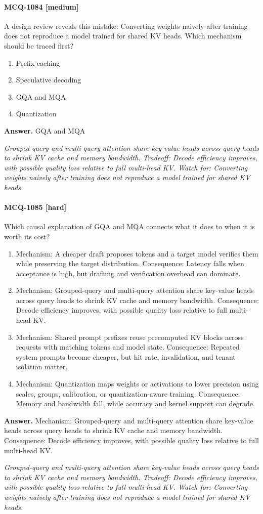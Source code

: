 \paragraph{MCQ-1084 [medium]} A design review reveals this mistake: Converting weights naively after training does not reproduce a model trained for shared KV heads. Which mechanism should be traced first?
\begin{enumerate}[label=\Alph*.]
\item Prefix caching
\item Speculative decoding
\item GQA and MQA
\item Quantization
\end{enumerate}
\noindent\textbf{Answer.} GQA and MQA
\par\textit{Grouped-query and multi-query attention share key-value heads across query heads to shrink KV cache and memory bandwidth. Tradeoff: Decode efficiency improves, with possible quality loss relative to full multi-head KV. Watch for: Converting weights naively after training does not reproduce a model trained for shared KV heads.}
\paragraph{MCQ-1085 [hard]} Which causal explanation of GQA and MQA connects what it does to when it is worth its cost?
\begin{enumerate}[label=\Alph*.]
\item Mechanism: A cheaper draft proposes tokens and a target model verifies them while preserving the target distribution. Consequence: Latency falls when acceptance is high, but drafting and verification overhead can dominate.
\item Mechanism: Grouped-query and multi-query attention share key-value heads across query heads to shrink KV cache and memory bandwidth. Consequence: Decode efficiency improves, with possible quality loss relative to full multi-head KV.
\item Mechanism: Shared prompt prefixes reuse precomputed KV blocks across requests with matching tokens and model state. Consequence: Repeated system prompts become cheaper, but hit rate, invalidation, and tenant isolation matter.
\item Mechanism: Quantization maps weights or activations to lower precision using scales, groups, calibration, or quantization-aware training. Consequence: Memory and bandwidth fall, while accuracy and kernel support can degrade.
\end{enumerate}
\noindent\textbf{Answer.} Mechanism: Grouped-query and multi-query attention share key-value heads across query heads to shrink KV cache and memory bandwidth. Consequence: Decode efficiency improves, with possible quality loss relative to full multi-head KV.
\par\textit{Grouped-query and multi-query attention share key-value heads across query heads to shrink KV cache and memory bandwidth. Tradeoff: Decode efficiency improves, with possible quality loss relative to full multi-head KV. Watch for: Converting weights naively after training does not reproduce a model trained for shared KV heads.}

